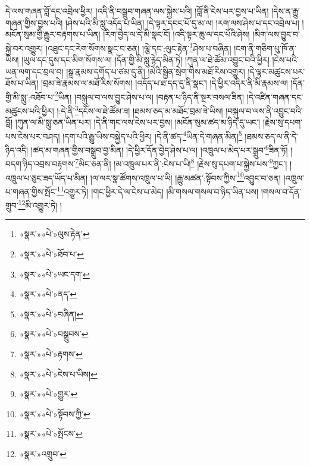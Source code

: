 དེ་ལས་གཞན་བློ་དང་འབྲེལ་ཕྱིར། །འདི་ནི་བསྒྲུབ་གཞན་ལས་སྐྱེས་པའི། །བློ་ནི་ངེས་པར་བྱས་པ་ཡིན། །དེས་ན་རྒྱུ་གཞན་གྱིས་བྱས་པའི། །ཤེས་པའི་མི་སླུ་འདོད་པ་ཡིན། །དེ་ལྟར་དབང་པོ་དུ་མ་ལ། །རག་ལས་ཤེས་པ་དང་འབྲེལ་པ། །མངོན་སུམ་གྱི་རྒྱུར་བརྟགས་པ་ཡིན། །རིག་བྱེད་ལ་དེ་མི་སྣང་ངོ། །འདི་ལྟར་ཆུ་ལ་དང་པོའི་ཤེས། །མིག་ལས་བྱུང་བ་སྐྱེ་བར་འགྱུར། །འཐུང་དང་རེག་སོགས་སྣང་བ་ཅན། །ལྕེ་དང་:ལུང་རྟེན་\footnote{«སྣར་»«པེ་»ལུས་རྟེན་}ཤེས་པ་བཞིན། །ངག་ནི་གཅིག་པུ་ཁོ་ན་ཡིས། །ཡུལ་དང་དུས་དང་མིག་སོགས་ལ། །དོན་གྱི་མི་སླུ་རྙེད་མིན་ཏེ། །ཀུན་ལ་ཐེ་ཚོམ་འབྱུང་བའི་ཕྱིར། །ངེས་པའི་ཡན་ལག་དང་བྲལ་བ། །སྒྲ་རྣམས་དགོད་པ་ཙམ་དུ་ནི། །མེའི་སྦྱིན་སྲེག་གིས་མཐོ་རིས་འགྱུར། །དེ་ལྟར་མཚུངས་པར་ཐོས་པ་ཡིན། །བྲམ་ཟེ་རྣམས་ལ་མཐོ་རིས་སོགས། །འདོད་པ་ཐ་དད་དུ་ནི་སྣང་། །དེ་ཕྱིར་འདིར་ནི་མི་རྣམས་ལ། །དོན་གྱི་མི་སླུ་:འཐོབ་པ་\footnote{«སྣར་»«པེ་»ཐོབ་པ་}ཡིན། །བསྐུལ་བ་ལས་བྱུང་ཤེས་པ་ལ། །བརྟན་པ་ཉིད་ནི་སྔར་བསལ་ཟིན། །དེ་འཛིན་གཞན་དང་མཚུངས་པའི་ཕྱིར། །:དེ་ནི་\footnote{«སྣར་»«པེ་»ཡང་དག་}དངོས་ལ་ཐེ་ཚོམ་ཟ། །ཐམས་ཅད་མ་མཐོང་བྲམ་ཟེ་ཡིས། །བསྐུལ་བ་ལས་ནི་འབྱུང་བའི་བློ། །ཀུན་ལ་མི་སླུ་ཅན་ཡིན་པར། །དེ་ནི་གང་ལས་ངེས་པར་བྱས། །མངོན་སུམ་ཚད་མ་ཉིད་དུ་ཡང་། །རྗེས་སུ་དཔག་པས་ངེས་པར་བཤད། །དག་པའི་རྒྱུ་ཡིས་བསྐྱེད་པའི་ཕྱིར། །དེ་ནི་ཚད་\footnote{«སྣར་»«པེ་»ནད་}ཡིན་དེ་གཞན་མིན།\footnote{«སྣར་»«པེ་»བཞིན།} །ཐམས་ཅད་ལ་ནི་དེ་ཉིད་འདི། །ཚད་མ་གཞན་གྱིས་བསྒྲུབ་བྱ་མིན། །དེ་ཕྱིར་དོན་བྱེད་ཤེས་པ་ལ། །འཁྲུལ་པ་མེད་པར་སྒྲུབ་\footnote{«སྣར་»«པེ་»བསྒྲུབས་}ཟིན་ཏོ། །བདག་ཉིད་འབྲས་བརྟགས་\footnote{«སྣར་»«པེ་»རྟགས་}མིང་ཅན་ནི། །མ་འཁྲུལ་པར་ནི་:ངེས་པ་ཡི།\footnote{«སྣར་»«པེ་»ངེས་པ་ཡིས།} །རྗེས་སུ་དཔག་པ་སྐྱེས་པས་\footnote{«སྣར་»«པེ་»གྱུར་}ཀྱང་། །འཁྲུལ་པ་ཅུང་ཟད་ཡོད་པ་མིན། །ལ་ལར་སྣ་ཚོགས་འཁྲུལ་པ་ཡི། །རྒྱུ་མཚན་:སྟོབས་ཀྱིས་\footnote{«སྣར་»«པེ་»སྟོབས་ཀྱི་}འབྱུང་བ་ཅན། །འཁྲུལ་པ་གཞན་གྱིས་སྤོང་\footnote{«སྣར་»«པེ་»སྤོངས་}འགྱུར་ཏེ། །གང་ཕྱིར་དེ་ལ་ངེས་པ་མེད། །མི་གསལ་གསལ་བ་ཉིད་ཡིན་པས། །གསལ་བ་དོན་གྲུབ་\footnote{«སྣར་»འགྲུབ་}མི་འགྱུར་ཏེ། །
